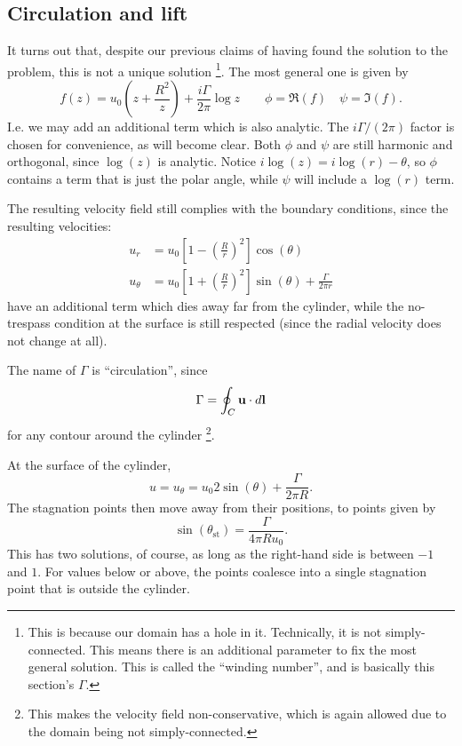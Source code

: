 \subsection{Circulation and lift}

It turns out that, despite our previous claims of having found the
solution to the problem, this is not a unique solution%
\footnote{This is because our domain has a hole in it. Technically, it
  is not simply-connected. This means there is an additional parameter
  to fix the most general solution. This is called the ``winding
  number'', and is basically this section's $\Gamma$.}.
%
The most general one is given by
\[
 f(z) = u_0 \left( z + \frac{R^2}{z} \right)
 + \frac{i \Gamma}{2\pi} \log z \qquad
 \phi=\Re(f) \quad
 \psi=\Im(f) .
\]
I.e. we may add an additional term which is also analytic. The $i
\Gamma/(2\pi)$ factor is chosen for convenience, as will become
clear. Both $\phi$ and $\psi$ are still harmonic and orthogonal, since
$\log(z)$ is analytic. Notice $i \log(z)= i \log(r) - \theta$, so
$\phi$ contains a term that is just the polar angle, while $\psi$ will
include a $\log(r)$ term.

The resulting velocity field still complies with the boundary
conditions, since the resulting velocities:
\begin{align}
u_r     &=   u_0  \left[ 1 - \left( \frac{R}{r}\right)^2 \right] \cos(\theta) \\
u_\theta &=   u_0  \left[ 1 + \left( \frac{R}{r}\right)^2 \right] \sin(\theta) +\frac{\Gamma}{2\pi r} 
\end{align}
have an additional term which dies away far from the cylinder, while
the no-trespass condition at the surface is still respected (since the
radial velocity does not change at all).

The name of $\Gamma$ is ``circulation'', since
\[
\Gamma = \oint_C \mathbf{u}\cdot d\mathbf{l}
\]
for any contour around the cylinder \footnote{This makes the velocity
  field non-conservative, which is again allowed due to the domain
  being not simply-connected.}.

At the surface of the cylinder,
\[
u= u_\theta =   u_0  2 \sin(\theta) +\frac{\Gamma}{2\pi R} .
\]
The stagnation points then move away from their positions, to points given by
\[
\sin(\theta_\mathrm{st})  = \frac{\Gamma}{4\pi R u_0} .
\]
This has two solutions, of course, as long as the right-hand side is
between $-1$ and $1$. For values below or above, the points coalesce
into a single stagnation point that is outside the cylinder.

